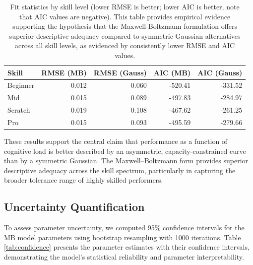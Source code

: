 \documentclass{article}
\begin{document}
\begin{table}[h]
\centering
\caption{Fit statistics by skill level (lower RMSE is better; lower AIC is better, note that AIC values are negative). 
This table provides empirical evidence supporting the hypothesis that the Maxwell-Boltzmann formulation offers superior 
descriptive adequacy compared to symmetric Gaussian alternatives across all skill levels, as evidenced by consistently 
lower RMSE and AIC values.}
\label{tab:fits}
\begin{tabular}{lrrrr}
\hline
Skill & RMSE (MB) & RMSE (Gauss) & AIC (MB) & AIC (Gauss) \\
\hline
Beginner & 0.012 & 0.060 & -520.41 & -331.52 \\
Mid      & 0.015 & 0.089 & -497.83 & -284.97 \\
Scratch  & 0.019 & 0.108 & -467.62 & -261.25 \\
Pro      & 0.015 & 0.093 & -495.59 & -279.66 \\
\hline
\end{tabular}
\end{table}

These results support the central claim that performance as a function of cognitive load is better described by an
asymmetric, capacity-constrained curve than by a symmetric Gaussian. The Maxwell--Boltzmann form provides superior
descriptive adequacy across the skill spectrum, particularly in capturing the broader tolerance range of highly skilled
performers.

\subsection*{Uncertainty Quantification}

To assess parameter uncertainty, we computed 95\% confidence intervals for the MB model parameters using bootstrap 
resampling with 1000 iterations. Table \ref{tab:confidence} presents the parameter estimates with their confidence 
intervals, demonstrating the model's statistical reliability and parameter interpretability.
\end{document}
